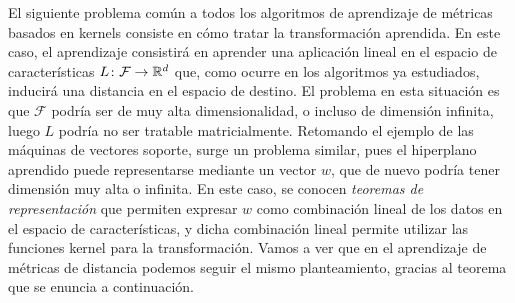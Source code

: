 El siguiente problema común a todos los algoritmos de aprendizaje de métricas basados en kernels consiste en cómo tratar la transformación aprendida. En este caso, el aprendizaje consistirá en aprender una aplicación lineal en el espacio de características $L \colon \mathcal{F} \to \mathbb{R}^d$ que, como ocurre en los algoritmos ya estudiados, inducirá una distancia en el espacio de destino. El problema en esta situación es que $\mathcal{F}$ podría ser de muy alta dimensionalidad, o incluso de dimensión infinita, luego $L$ podría no ser tratable matricialmente. Retomando el ejemplo de las máquinas de vectores soporte, surge un problema similar, pues el hiperplano aprendido puede representarse mediante un vector $w$, que de nuevo podría tener dimensión muy alta o infinita. En este caso, se conocen \emph{teoremas de representación} que permiten expresar $w$ como combinación lineal de los datos en el espacio de características, y dicha combinación lineal permite utilizar las funciones kernel para la transformación. Vamos a ver que en el aprendizaje de métricas de distancia podemos seguir el mismo planteamiento, gracias al teorema que se enuncia a continuación.

